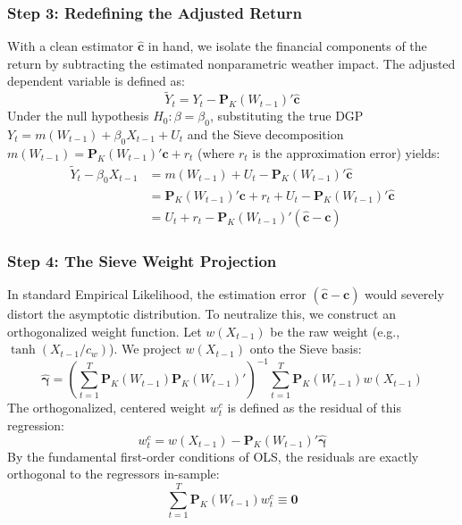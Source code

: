 \documentclass{article}
\begin{document}
\subsubsection*{Step 3: Redefining the Adjusted Return}
With a clean estimator $\widehat{\bm{c}}$ in hand, we isolate the financial components of the return by subtracting the estimated nonparametric weather impact. The adjusted dependent variable is defined as:
\begin{equation}
    \widetilde{Y}_t = Y_t - \bm{P}_K(W_{t-1})'\widehat{\bm{c}}
\end{equation}
Under the null hypothesis $H_0: \beta = \beta_0$, substituting the true DGP $Y_t = m(W_{t-1}) + \beta_0 X_{t-1} + U_t$ and the Sieve decomposition $m(W_{t-1}) = \bm{P}_K(W_{t-1})'\bm{c} + r_t$ (where $r_t$ is the approximation error) yields:
\begin{align}
    \widetilde{Y}_t - \beta_0 X_{t-1} &= m(W_{t-1}) + U_t - \bm{P}_K(W_{t-1})'\widehat{\bm{c}} \\
    &= \bm{P}_K(W_{t-1})'\bm{c} + r_t + U_t - \bm{P}_K(W_{t-1})'\widehat{\bm{c}} \\
    &= U_t + r_t - \bm{P}_K(W_{t-1})'(\widehat{\bm{c}} - \bm{c})
\end{align}

\subsubsection*{Step 4: The Sieve Weight Projection}
In standard Empirical Likelihood, the estimation error $(\widehat{\bm{c}} - \bm{c})$ would severely distort the asymptotic distribution. To neutralize this, we construct an orthogonalized weight function. Let $w(X_{t-1})$ be the raw weight (e.g., $\tanh(X_{t-1}/c_w)$). We project $w(X_{t-1})$ onto the Sieve basis:
\begin{equation}
    \widehat{\bm{\gamma}} = \left( \sum_{t=1}^T \bm{P}_K(W_{t-1}) \bm{P}_K(W_{t-1})' \right)^{-1} \sum_{t=1}^T \bm{P}_K(W_{t-1}) w(X_{t-1})
\end{equation}
The orthogonalized, centered weight $w^c_t$ is defined as the residual of this regression:
\begin{equation}
    w^c_t = w(X_{t-1}) - \bm{P}_K(W_{t-1})' \widehat{\bm{\gamma}}
\end{equation}
By the fundamental first-order conditions of OLS, the residuals are exactly orthogonal to the regressors in-sample:
\begin{equation}
    \sum_{t=1}^T \bm{P}_K(W_{t-1}) w^c_t \equiv \bm{0}
\end{equation}
\end{document}
